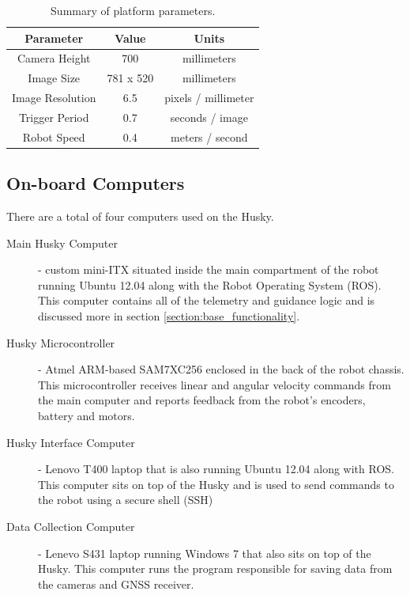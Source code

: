 \begin{table}[htb]
    \begin{center}
    \caption{Summary of platform parameters.}
    \begin{tabular}[c]{|c|c|c|}
        \hline
        Parameter & Value & Units \\
        \hline
        Camera Height    & 700       & millimeters         \\
        Image Size       & 781 x 520 & millimeters         \\
        Image Resolution & 6.5       & pixels / millimeter \\
        Trigger Period   & 0.7       & seconds / image     \\
        Robot Speed      & 0.4       & meters / second     \\
        \hline
    \end{tabular}
    \label{table:platform_params}
   \end{center}
\end{table}

\subsection{On-board Computers}

There are a total of four computers used on the Husky.

\begin{description}
\item[Main Husky Computer] - custom mini-ITX situated inside the main compartment of the robot running Ubuntu 12.04 along with the Robot Operating System (ROS). This computer contains all of the telemetry and guidance logic and is discussed more in section \ref{section:base_functionality}.  
\item[Husky Microcontroller] - Atmel ARM-based SAM7XC256 enclosed in the back of the robot chassis.  This microcontroller receives linear and angular velocity commands from the main computer and reports feedback from the robot's encoders, battery and motors. 
\item[Husky Interface Computer] - Lenovo T400 laptop that is also running Ubuntu 12.04 along with ROS.  This computer sits on top of the Husky and is used to send commands to the robot using a secure shell (SSH)
\item[Data Collection Computer] - Lenevo S431 laptop running Windows 7 that also sits on top of the Husky.  This computer runs the program responsible for saving data from the cameras and GNSS receiver.   
\end{description}

